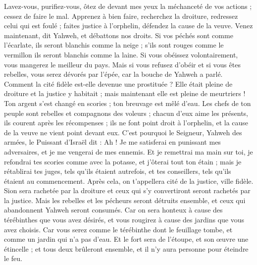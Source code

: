 \begin{multicols}{2}
Lavez-vous, purifiez-vous, ôtez de devant mes yeux la méchanceté de vos actions ; cessez de faire le mal.
Apprenez à bien faire, recherchez la droiture, redressez celui qui est foulé ; faites justice à l'orphelin, défendez la cause de la veuve.
Venez maintenant, dit Yahweh, et débattons nos droits. Si vos péchés sont comme l'écarlate, ils seront blanchis comme la neige ; s'ils sont rouges comme le vermillon ils seront blanchis comme la laine.
Si vous obéissez volontairement, vous mangerez le meilleur du pays.
Mais si vous refusez d'obéir et si vous êtes rebelles, vous serez dévorés par l'épée, car la bouche de Yahweh a parlé.
Comment la cité fidèle est-elle devenue une prostituée ? Elle était pleine de droiture et la justice y habitait ; mais maintenant elle est pleine de meurtriers !
Ton argent s'est changé en scories ; ton breuvage est mêlé d'eau. 
Les chefs de ton peuple sont rebelles et compagnons des voleurs ; chacun d'eux aime les présents, ils courent après les récompenses ; ils ne font point droit à l'orphelin, et la cause de la veuve ne vient point devant eux. 
C'est pourquoi le Seigneur, Yahweh des armées, le Puissant d'Israël dit : Ah ! Je me satisferai en punissant mes adversaires, et je me vengerai de mes ennemis. 
Et je remettrai ma main sur toi, je refondrai tes scories comme avec la potasse, et j'ôterai tout ton étain ;
mais je rétablirai tes juges, tels qu'ils étaient autrefois, et tes conseillers, tels qu'ils étaient au commencement. Après cela, on t'appellera cité de la justice, ville fidèle.
Sion sera rachetée par la droiture et ceux qui s'y convertiront seront rachetés par la justice.
Mais les rebelles et les pécheurs seront détruits ensemble, et ceux qui abandonnent Yahweh seront consumés.
Car on sera honteux à cause des térébinthes que vous avez désirés, et vous rougirez à cause des jardins que vous avez choisis.
Car vous serez comme le térébinthe dont le feuillage tombe, et comme un jardin qui n'a pas d'eau.
Et le fort sera de l'étoupe, et son œuvre une étincelle ; et tous deux brûleront ensemble, et il n'y aura personne pour éteindre le feu.

\end{multicols}
